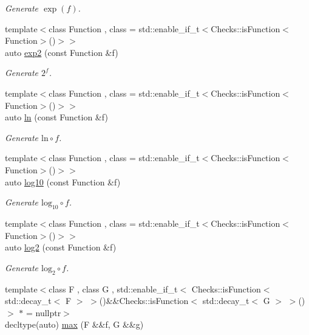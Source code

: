 \begin{DoxyCompactItemize}
\begin{DoxyCompactList}\small\item\em Generate $ \exp(f) $. \end{DoxyCompactList}\item 
{\footnotesize template$<$class Function , class  = std\+::enable\+\_\+if\+\_\+t$<$\+Checks\+::is\+Function$<$\+Function$>$()$>$$>$ }\\auto \hyperlink{group__CMathGroup_ga7724faf7db6e9583ac91df322c26ecf5}{exp2} (const Function \&f)
\begin{DoxyCompactList}\small\item\em Generate $2^f$. \end{DoxyCompactList}\item 
{\footnotesize template$<$class Function , class  = std\+::enable\+\_\+if\+\_\+t$<$\+Checks\+::is\+Function$<$\+Function$>$()$>$$>$ }\\auto \hyperlink{group__CMathGroup_ga31313571b08f65b853643e14fc8fc714}{ln} (const Function \&f)
\begin{DoxyCompactList}\small\item\em Generate $ \mathrm{ln}\circ f $. \end{DoxyCompactList}\item 
{\footnotesize template$<$class Function , class  = std\+::enable\+\_\+if\+\_\+t$<$\+Checks\+::is\+Function$<$\+Function$>$()$>$$>$ }\\auto \hyperlink{group__CMathGroup_gae9506f4e0e6fad4f756f636044697bfe}{log10} (const Function \&f)
\begin{DoxyCompactList}\small\item\em Generate $ \mathrm{log}_{10}\circ f $. \end{DoxyCompactList}\item 
{\footnotesize template$<$class Function , class  = std\+::enable\+\_\+if\+\_\+t$<$\+Checks\+::is\+Function$<$\+Function$>$()$>$$>$ }\\auto \hyperlink{group__CMathGroup_gacd6be7e9de7bbd54c852f0acf0c7d2c2}{log2} (const Function \&f)
\begin{DoxyCompactList}\small\item\em Generate $ \mathrm{log}_{2}\circ f $. \end{DoxyCompactList}\item 
{\footnotesize template$<$class F , class G , std\+::enable\+\_\+if\+\_\+t$<$ Checks\+::is\+Function$<$ std\+::decay\+\_\+t$<$ F $>$ $>$()\&\&\+Checks\+::is\+Function$<$ std\+::decay\+\_\+t$<$ G $>$ $>$() $>$ $\ast$  = nullptr$>$ }\\decltype(auto) \hyperlink{group__CMathGroup_ga012e475862c540ed8a2a083414cb2917}{max} (F \&\&f, G \&\&g)

\end{DoxyCompactItemize}
